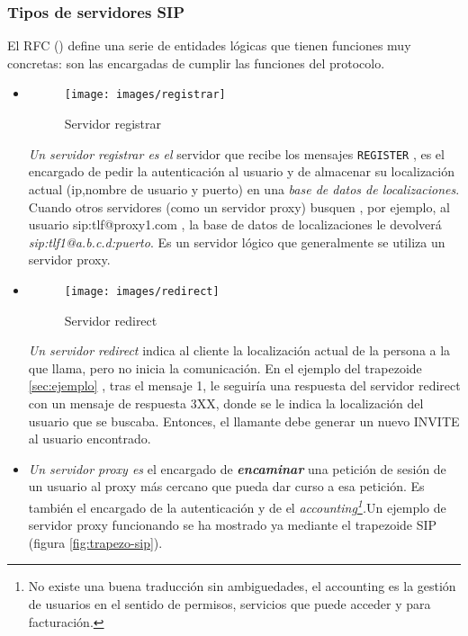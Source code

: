 \subsubsection{Tipos de servidores SIP}
\label{sec:tipos-de-servidores}

El RFC (\cite{rfc3261}) define una serie de entidades lógicas que tienen funciones muy concretas: son las encargadas de cumplir las funciones del protocolo.

\begin{itemize}


\item {}

\begin{figure}[!h]
\label{fig:sip-registrar}  
\centering
  \texttt{[image: images/registrar]}
  \caption{Servidor registrar}
\end{figure}

\emph{Un servidor registrar es el} servidor que recibe los mensajes \verb|REGISTER| , es el encargado de pedir la autenticación al usuario y de almacenar su localización actual (ip,nombre de usuario y puerto) en una \emph{base de datos de localizaciones}. Cuando otros servidores (como un servidor proxy) busquen , por ejemplo, al usuario sip:tlf@proxy1.com , la base de datos de localizaciones le devolverá \\ \emph{sip:tlf1@a.b.c.d:puerto}. Es un servidor lógico que generalmente se utiliza un servidor proxy. 


\item {}

\begin{figure}[!h]
  \centering
  \texttt{[image: images/redirect]}
  \caption{Servidor redirect}
  \label{fig:sip-redirect}
\end{figure}

\emph{Un servidor redirect} indica al cliente la localización actual de la persona a la que llama, pero no inicia la comunicación. En el ejemplo del trapezoide \ref{sec:ejemplo} , tras el mensaje 1, le seguiría una respuesta del servidor redirect con un mensaje de respuesta 3XX, donde se le indica la localización del usuario que se buscaba. Entonces, el llamante debe generar un nuevo INVITE al usuario encontrado. 



\item {}

\emph{Un servidor proxy es} el encargado de \textbf{\emph{encaminar}} una petición de sesión de un usuario al proxy más cercano que pueda dar curso a esa petición. Es también el encargado de la autenticación y de el \emph{accounting\footnote{No existe una buena traducción sin ambiguedades, el accounting es la gestión de usuarios en el sentido de permisos, servicios que puede acceder y para facturación.}.}Un ejemplo de servidor proxy funcionando se ha mostrado ya mediante el trapezoide SIP (figura \ref{fig:trapezo-sip}).

\end{itemize}
